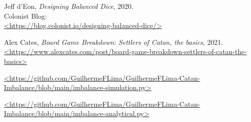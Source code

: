 \documentclass[11pt]{article}
\begin{document}
\begin{thebibliography}{9}

  Jeff d'Eon, \textit{Designing Balanced Dice}, 2020.\\
  Colonist Blog: \\
  \url{<https://blog.colonist.io/designing-balanced-dice/>}
 
 Alex Cates, \textit{Board Game Breakdown: Settlers of Catan, the basics}, 2021. \\
 \url{<https://www.alexcates.com/post/board-game-breakdown-settlers-of-catan-the-basics>}

\url{<https://github.com/GuilhermeFLima/GuilhermeFLima-Catan-Imbalance/blob/main/imbalance-simulation.py>}

\url{<https://github.com/GuilhermeFLima/GuilhermeFLima-Catan-Imbalance/blob/main/imbalance-analytical.py>}


\end{thebibliography}
\end{document}
